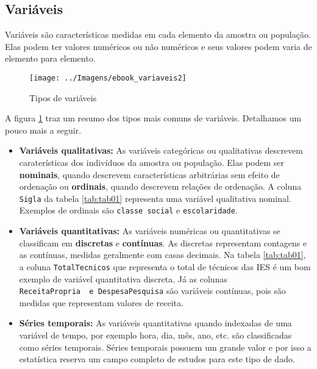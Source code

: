 \documentclass[11pt,]{style/krantz}
\theoremstyle{definition}
\theoremstyle{definition}
\theoremstyle{definition}
\theoremstyle{remark}
\begin{document}
\hypertarget{variaveis}{%
\subsection{Variáveis}\label{variaveis}}

Variáveis são características medidas em cada elemento da amostra ou população. Elas podem ter valores numéricos ou não numéricos e seus valores podem varia de elemento para elemento.

\begin{figure}[H]

{\centering \texttt{[image: ../Imagens/ebook\_variaveis2]} 

}

\caption{Tipos de variáveis}\label{fig:fig06}
\end{figure}

A figura \ref{fig:fig06} traz um resumo dos tipos mais comuns de variáveis. Detalhamos um pouco mais a seguir.

\begin{itemize}
\item
  \textbf{Variáveis qualitativas:} As variáveis categóricas ou qualitativas descrevem caraterísticas dos indivíduos da amostra ou população. Elas podem ser \textbf{nominais}, quando descrevem características arbitrárias sem efeito de ordenação ou \textbf{ordinais}, quando descrevem relações de ordenação. A coluna \texttt{Sigla} da tabela \ref{tab:tab01} representa uma variável qualitativa nominal. Exemplos de ordinais são \texttt{classe\ social} e \texttt{escolaridade}.
\item
  \textbf{Variáveis quantitativas:} As variáveis numéricas ou quantitativas se classificam em \textbf{discretas} e \textbf{contínuas}. As discretas representam contagens e as contínuas, medidas geralmente com casas decimais. Na tabela \ref{tab:tab01}, a coluna \texttt{TotalTecnicos} que representa o total de técnicos das IES é um bom exemplo de variável quantitativa discreta. Já as colunas \texttt{ReceitaPropria\ \ e\ DespesaPesquisa} são variáveis contínuas, pois são medidas que representam valores de receita.
\item
  \textbf{Séries temporais:} As variáveis quantitativas quando indexadas de uma variável de tempo, por exemplo hora, dia, mês, ano, etc. são classificadas como séries temporais. Séries temporais possuem um grande valor e por isso a estatística reserva um campo completo de estudos para este tipo de dado.
\end{itemize}
\end{document}

